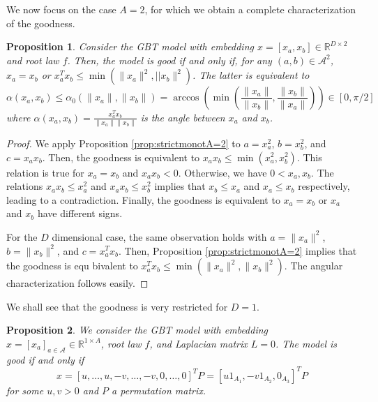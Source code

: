 \documentclass{article}
\newtheorem{proposition}{Proposition}
\newcommand{\cA}{\mathcal A}
\begin{document}
We now focus on the case $A=2$, for which we obtain a complete characterization of the goodness.

\begin{proposition} \label{prop:strongmonoto2alternatives}
Consider the GBT model with embedding $x = [x_a, x_b] \in \mathbb{R}^{D \times 2}$ and root law $f$. Then, the model is good if and only if, for any $(a,b)\in\cA^2$, $x_a = x_b$ or $x_a^T x_b \leq \min( \| x_a \|^2 , ||x_b \|^2)$. The latter is equivalent to
    \begin{equation}
    \alpha(x_a ,x_b) \leq \alpha_0( \| x_a \|, \|x_b \|) =  \arccos \left(\min\left( \frac{\|x_a\|}{\|x_b\|}, \frac{\|x_b\|}{\|x_a\|} \right) \right) \in [0,\pi/2]
    \end{equation}
    where $\alpha(x_a ,x_b) = \frac{x_a^T x_b}{ \|x_a \| \| x_b \| }$ is the angle between $x_a$ and $x_b$.
\end{proposition}

 \begin{proof}
    We apply Proposition \ref{prop:strictmonotA=2} to $a = x_a^2$, $b = x_b^2$, and $c = x_a x_b$. Then, the goodness is equivalent to $x_a x_b \leq \min(x_a^2, x_b^2)$. This relation is true for $x_a = x_b$ and $x_a x_b <0$. Otherwise, we have $0 < x_a , x_b$. The relations $x_a x_b \leq x_a^2$ and $x_a x_b \leq x_b^2$ implies that $x_b \leq x_a$ and $x_a \leq x_b$ respectively, leading to a contradiction. Finally, the goodness is equivalent to $x_a = x_b$ or $x_a$ and $x_b$ have different signs. 

     For the $D$ dimensional case, the same observation holds with $a = \| x_a \|^2$, $b = \| x_b \|^2$, and $c = x_a^T x_b$. Then, Proposition \ref{prop:strictmonotA=2} implies that the goodness is equ bivalent to $x_a^T x_b \leq \min(\| x_a \|^2, \| x_b \|^2)$. The angular characterization follows easily. 
 \end{proof}

 We shall see that the goodness is very restricted for $D=1$.

     \begin{proposition} \label{prop:partialthetaD1}
     We consider the GBT model with embedding $x = [x_a]_{a\in \mathcal{A}} \in \mathbb{R}^{1 \times A}$, root law $f$, and Laplacian matrix $L = 0$.
    The model is good if and only if
     \begin{equation} \label{eq:xstronglymonotonousD1}
        x =  [u, \ldots ,u, -v, \ldots, -v, 0, \ldots , 0]^T P = [u 1_{A_1}, - v 1_{A_2}, 0_{A_3}]^T P
     \end{equation}
     for some $u,v > 0$ and $P$ a permutation matrix.
    \end{proposition}
    
\end{document}
